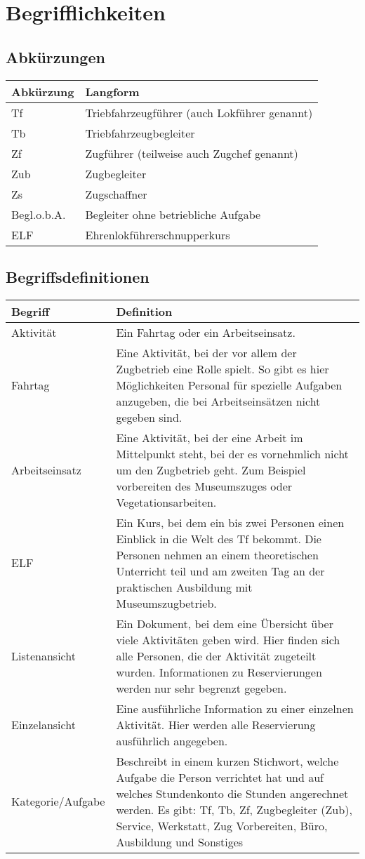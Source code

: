 \chapter{Begrifflichkeiten}
\section{Abkürzungen}\label{abkuerzungen}
\begin{tabularx}{\textwidth}{l|X}
  Abkürzung & Langform \\
  \hline
  \hline
  Tf & Triebfahrzeugführer (auch Lokführer genannt)\\
  \hline
  Tb & Triebfahrzeugbegleiter \\
  \hline
  Zf & Zugführer (teilweise auch Zugchef genannt)\\
  \hline
  Zub	& Zugbegleiter \\
  \hline
  Zs & Zugschaffner \\
  \hline
  Begl.o.b.A. & Begleiter ohne betriebliche Aufgabe \\
  \hline
  ELF &	Ehrenlokführerschnupperkurs \\
\end{tabularx}


\section{Begriffsdefinitionen}\label{glossar}
\begin{tabularx}{\textwidth}{l|X}
  Begriff	& Definition \\
  \hline
  \hline
  Aktivität &
    Ein Fahrtag oder ein Arbeitseinsatz. \\
  \hline
  Fahrtag	&
    Eine Aktivität, bei der vor allem der Zugbetrieb eine Rolle spielt.
    So gibt es hier Möglichkeiten Personal für spezielle Aufgaben anzugeben, die bei Arbeitseinsätzen nicht gegeben sind.\\
  \hline
  Arbeitseinsatz &
    Eine Aktivität, bei der eine Arbeit im Mittelpunkt steht, bei der es vornehmlich nicht um den Zugbetrieb geht.
    Zum Beispiel vorbereiten des Museumszuges oder Vegetationsarbeiten. \\
  \hline
  ELF &
    Ein Kurs, bei dem ein bis zwei Personen einen Einblick in die Welt des Tf bekommt.
    Die Personen nehmen an einem theoretischen Unterricht teil und am zweiten Tag an der praktischen Ausbildung mit Museumszugbetrieb.\\
  \hline
  Listenansicht &
    Ein Dokument, bei dem eine Übersicht über viele Aktivitäten geben wird.
    Hier finden sich alle Personen, die der Aktivität zugeteilt wurden.
    Informationen zu Reservierungen werden nur sehr begrenzt gegeben. \\
  \hline
  Einzelansicht &
  	Eine ausführliche Information zu einer einzelnen Aktivität.
    Hier werden alle Reservierung ausführlich angegeben. \\
  \hline
  Kategorie/Aufgabe &
  	Beschreibt in einem kurzen Stichwort, welche Aufgabe die Person verrichtet hat und auf welches Stundenkonto die Stunden angerechnet werden. \newline
    Es gibt: Tf, Tb, Zf, Zugbegleiter (Zub), Service, Werkstatt, Zug Vorbereiten, Büro, Ausbildung und Sonstiges
\end{tabularx}
